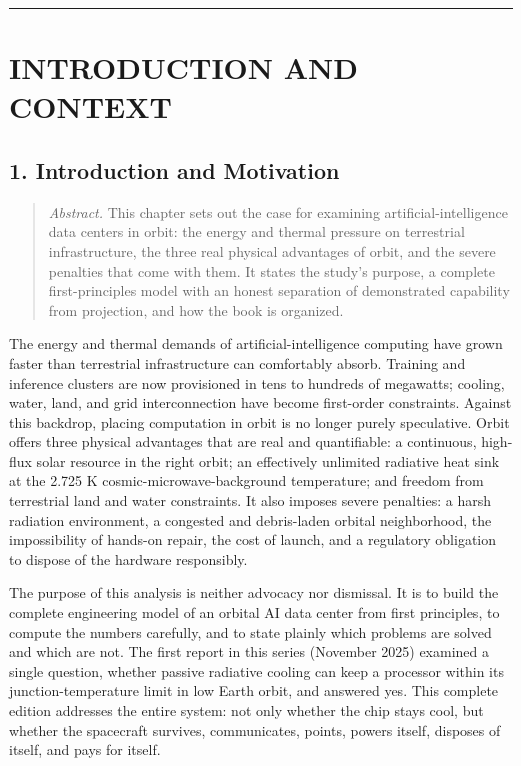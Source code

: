 \documentclass[
  11pt,
  openany,
  oneside]{book}
\begin{document}
\begin{center}\rule{0.5\linewidth}{0.5pt}\end{center}

\part{INTRODUCTION AND CONTEXT}\label{introduction-and-context}

\chapter{1. Introduction and
Motivation}\label{introduction-and-motivation}

\begin{quote}
\emph{Abstract.} This chapter sets out the case for examining
artificial-intelligence data centers in orbit: the energy and thermal
pressure on terrestrial infrastructure, the three real physical
advantages of orbit, and the severe penalties that come with them. It
states the study's purpose, a complete first-principles model with an
honest separation of demonstrated capability from projection, and how
the book is organized.
\end{quote}

The energy and thermal demands of artificial-intelligence computing have
grown faster than terrestrial infrastructure can comfortably absorb.
Training and inference clusters are now provisioned in tens to hundreds
of megawatts; cooling, water, land, and grid interconnection have become
first-order constraints. Against this backdrop, placing computation in
orbit is no longer purely speculative. Orbit offers three physical
advantages that are real and quantifiable: a continuous, high-flux solar
resource in the right orbit; an effectively unlimited radiative heat
sink at the 2.725 K cosmic-microwave-background temperature; and freedom
from terrestrial land and water constraints. It also imposes severe
penalties: a harsh radiation environment, a congested and debris-laden
orbital neighborhood, the impossibility of hands-on repair, the cost of
launch, and a regulatory obligation to dispose of the hardware
responsibly.

The purpose of this analysis is neither advocacy nor dismissal. It is to
build the complete engineering model of an orbital AI data center from
first principles, to compute the numbers carefully, and to state plainly
which problems are solved and which are not. The first report in this
series (November 2025) examined a single question, whether passive
radiative cooling can keep a processor within its junction-temperature
limit in low Earth orbit, and answered yes. This complete edition
addresses the entire system: not only whether the chip stays cool, but
whether the spacecraft survives, communicates, points, powers itself,
disposes of itself, and pays for itself.
\end{document}
